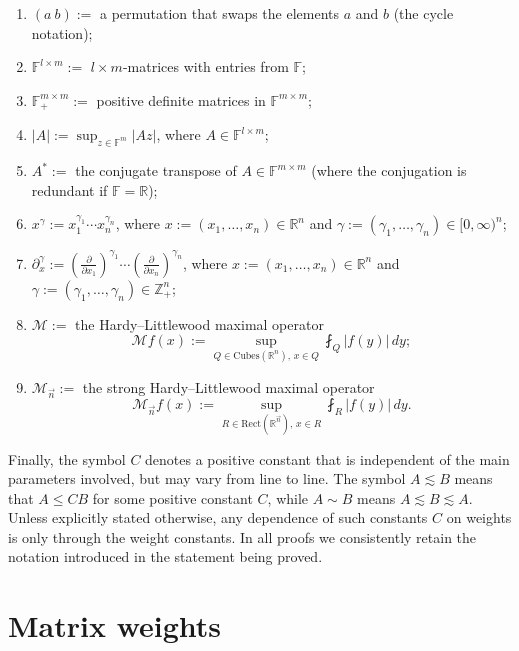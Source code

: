 \documentclass[11pt, reqno]{amsart}
\theoremstyle{definition}
\theoremstyle{remark}
\numberwithin{equation}{section}
\newcommand{\F}{\mathbb F}
\newcommand{\R}{\mathbb R}
\newcommand{\vn}{\vec n}
\newcommand{\perm}[2]{(#1\ #2)}
\newcommand{\Cubes}{\mathrm{Cubes}}
\newcommand{\Rect}{\mathrm{Rect}}
\begin{document}
\begin{enumerate}[]
\item $\perm{a}{b}:=$ a permutation that swaps the elements $a$ and $b$ (the cycle notation);

\item $\F^{l\times m}:=$ $l\times m$-matrices with entries from $\F$;

\item $\F_+^{m\times m}:=$ positive definite matrices in $\F^{m\times m}$;

\item $|A|:= \sup_{z\in\F^m} |Az|$, where $A\in \mathbb F^{l\times m}$;

\item $A^*:=$ the conjugate transpose of $A\in \mathbb F^{m\times m}$ (where the conjugation is redundant if $\F=\R$);

\item $x^\gamma := x_1^{\gamma_1} \cdots x_n^{\gamma_n}$, where
$x := (x_1, \ldots, x_n) \in \mathbb{R}^n$ and
$\gamma := (\gamma_1, \ldots, \gamma_n) \in [0,\infty)^n$;

\item $\partial^\gamma_x := (\frac{\partial}{\partial x_1})^{\gamma_1}
\cdots (\frac{\partial}{\partial x_n})^{\gamma_n}$,
where
$x := (x_1, \ldots, x_n) \in \mathbb{R}^n$ and
$\gamma := (\gamma_1, \ldots, \gamma_n) \in \mathbb{Z}_+^n$;

\item $\mathcal M:=$ the Hardy--Littlewood maximal operator
$$\mathcal Mf(x):=\sup_{Q\in\Cubes(\R^{n}),\, x\in Q} \fint_Q |f(y)| \, dy;$$

\item $\mathcal M_{\vn}:=$ the strong Hardy--Littlewood maximal operator
$$\mathcal M_{\vn}f(x):=\sup_{R\in\Rect(\R^{\vn}),\, x\in R} \fint_R |f(y)| \, dy.$$
\end{enumerate}

Finally, the symbol $C$ denotes a positive constant
that is independent of the main parameters involved,
but may vary from line to line. The symbol $A\lesssim B$
means that $A\le CB$ for some positive constant
$C$, while $A\sim B$ means $A\lesssim B\lesssim A$.
Unless explicitly stated otherwise,
any dependence of such constants $C$ on weights is only through the weight constants.
In all proofs we consistently retain the notation
introduced in the statement being proved.

\section{Matrix weights}\label{sec:weights}
\end{document}
